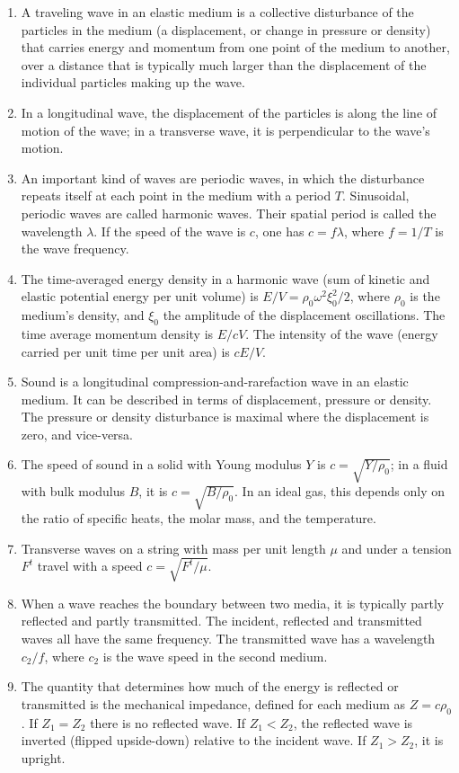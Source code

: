 \documentclass[10pt]{article}
\begin{document}
\begin{enumerate}
  \item A traveling wave in an elastic medium is a collective disturbance of the particles in the medium (a displacement, or change in pressure or density) that carries energy and momentum from one point of the medium to another, over a distance that is typically much larger than the displacement of the individual particles making up the wave.
  \item In a longitudinal wave, the displacement of the particles is along the line of motion of the wave; in a transverse wave, it is perpendicular to the wave's motion.
  \item An important kind of waves are periodic waves, in which the disturbance repeats itself at each point in the medium with a period $T$. Sinusoidal, periodic waves are called harmonic waves. Their spatial period is called the wavelength $\lambda$. If the speed of the wave is $c$, one has $c=f \lambda$, where $f=1 / T$ is the wave frequency.
  \item The time-averaged energy density in a harmonic wave (sum of kinetic and elastic potential energy per unit volume) is $E / V=\rho_{0} \omega^{2} \xi_{0}^{2} / 2$, where $\rho_{0}$ is the medium's density, and $\xi_{0}$ the amplitude of the displacement oscillations. The time average momentum density is $E / c V$. The intensity of the wave (energy carried per unit time per unit area) is $c E / V$.
  \item Sound is a longitudinal compression-and-rarefaction wave in an elastic medium. It can be described in terms of displacement, pressure or density. The pressure or density disturbance is maximal where the displacement is zero, and vice-versa.
  \item The speed of sound in a solid with Young modulus $Y$ is $c=\sqrt{Y / \rho_{0}}$; in a fluid with bulk modulus $B$, it is $c=\sqrt{B / \rho_{0}}$. In an ideal gas, this depends only on the ratio of specific heats, the molar mass, and the temperature.
  \item Transverse waves on a string with mass per unit length $\mu$ and under a tension $F^{t}$ travel with a speed $c=\sqrt{F^{t} / \mu}$.
  \item When a wave reaches the boundary between two media, it is typically partly reflected and partly transmitted. The incident, reflected and transmitted waves all have the same frequency. The transmitted wave has a wavelength $c_{2} / f$, where $c_{2}$ is the wave speed in the second medium.
  \item The quantity that determines how much of the energy is reflected or transmitted is the mechanical impedance, defined for each medium as $Z=c \rho_{0}$. If $Z_{1}=Z_{2}$ there is no reflected wave. If $Z_{1}<Z_{2}$, the reflected wave is inverted (flipped upside-down) relative to the incident wave. If $Z_{1}>Z_{2}$, it is upright.

\end{enumerate}
\end{document}
